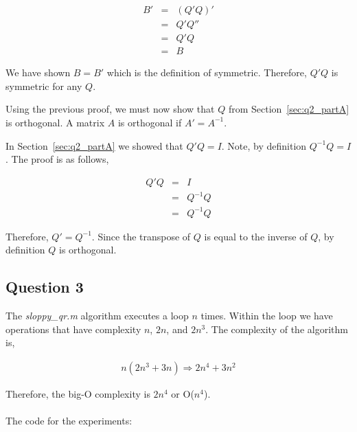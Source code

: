 \begin{eqnarray}
  B' &=& (Q'Q)' \\
  &=& Q'Q'' \\
  &=& Q'Q \\
  &=& B
\end{eqnarray}

We have shown \(B = B'\) which is the definition of symmetric. 
Therefore, \(Q'Q\) is symmetric for any \(Q\). 

Using the previous proof, we must now show that \(Q\) from Section~\ref{sec:q2_partA} is orthogonal.
A matrix \(A\) is orthogonal if \(A' = A^{-1}\).

In Section~\ref{sec:q2_partA} we showed that \(Q'Q = I\).
Note, by definition \(Q^{-1}Q = I\).
The proof is as follows,

\begin{eqnarray}
  Q'Q &=& I \\
  &=& Q^{-1}Q \\
  &=& Q^{-1}Q
\end{eqnarray}

Therefore, \(Q' = Q^{-1}\).
Since the transpose of \(Q\) is equal to the inverse of \(Q\), by definition \(Q\) is orthogonal.

\newpage
\subsection{Question 3}

The {\em sloppy\_qr.m} algorithm executes a loop \(n\) times.
Within the loop we have operations that have complexity \(n\), \(2n\), and \(2n^{3}\).
The complexity of the algorithm is,

\begin{eqnarray}
  n(2n^{3}+3n) \Rightarrow \boxed{2n^{4}+3n^2}
\end{eqnarray}

Therefore, the big-O complexity is \(2n^{4}\) or O(\(n^4\)).
\\
\\
The code for the experiments:


